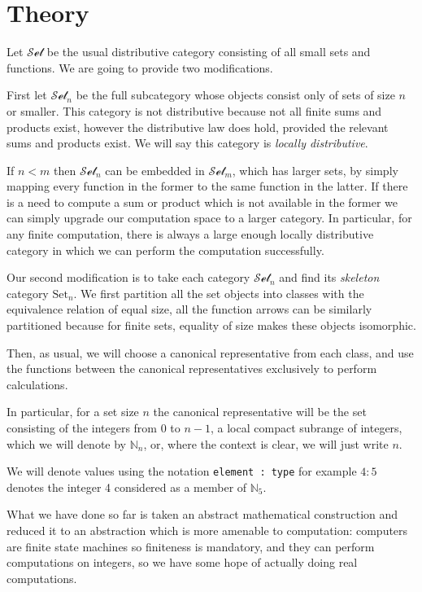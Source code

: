 \documentclass[oneside]{book}
\theoremstyle{plain}
\theoremstyle{definition}
\theoremstyle{plain}
\begin{document}
\section{Theory}
Let $\mathcal{Set}$ be the usual distributive category consisting of all small sets and functions.
We are going to provide two modifications. 

First let $\mathcal{Set}_n$ be the full subcategory whose
objects consist only of sets of size $n$ or smaller. This category is not distributive because not
all finite sums and products exist, however the distributive law does hold, provided the relevant
sums and products exist. We will say this category is {\em locally distributive}.

If $n < m$ then $\mathcal{Set}_n$ can be embedded in $\mathcal{Set}_m$, which has larger sets,
by simply mapping every function in the former to the same function in the latter. 
If there is a need to compute a sum or product which is not available in 
the former we can simply upgrade our computation space to a larger category. 
In particular, for any finite computation, there is always a large enough locally
distributive category in which we can perform the computation successfully.

Our second modification is to take each category $\mathcal{Set}_n$ and find its
{\em skeleton} category $\mathrm{Set}_n$. We first partition all the set objects
into classes with the equivalence relation of equal size, all the function arrows
can be similarly partitioned because for finite sets, equality of size makes these
objects isomorphic.

Then, as usual, we will choose a canonical representative from each class, and use
the functions between the canonical representatives exclusively to perform
calculations.

In particular, for a set size $n$ the canonical representative will be the set
consisting of the integers from 0 to $n-1$, a local compact subrange of integers,
which we will denote by $\mathbb{N}_n$, or, where the context is clear, we will
just write $n$. 

We will denote values using the notation \verb$element : type$ for example
$4:5$ denotes the integer 4 considered as a member of $\mathbb{N}_5$.

What we have done so far is taken an abstract mathematical construction and
reduced it to an abstraction which is more amenable to computation: computers
are finite state machines so finiteness is mandatory, and they can perform
computations on integers, so we have some hope of actually doing real
computations. 
\end{document}
